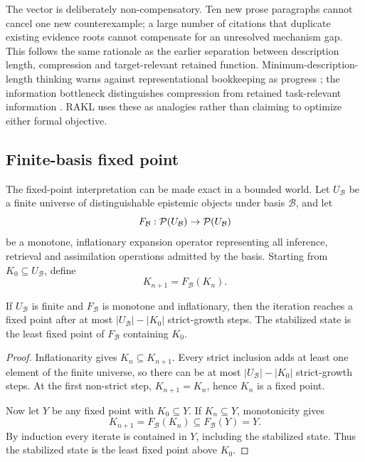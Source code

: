 The vector is deliberately non-compensatory. Ten new prose paragraphs cannot cancel one new counterexample; a large number of citations that duplicate existing evidence roots cannot compensate for an unresolved mechanism gap. This follows the same rationale as the earlier separation between description length, compression and target-relevant retained function. Minimum-description-length thinking warns against representational bookkeeping as progress \cite{rissanen1978}; the information bottleneck distinguishes compression from retained task-relevant information \cite{tishby2000}. RAKL uses these as analogies rather than claiming to optimize either formal objective.

\subsection{Finite-basis fixed point}

The fixed-point interpretation can be made exact in a bounded world. Let \(U_{\mathcal B}\) be a finite universe of distinguishable epistemic objects under basis \(\mathcal B\), and let
\[
F_{\mathcal B}:\mathcal P(U_{\mathcal B})\to\mathcal P(U_{\mathcal B})
\]
be a monotone, inflationary expansion operator representing all inference, retrieval and assimilation operations admitted by the basis. Starting from \(K_0\subseteq U_{\mathcal B}\), define
\[
K_{n+1}=F_{\mathcal B}(K_n).
\]

\begin{theorem}
If \(U_{\mathcal B}\) is finite and \(F_{\mathcal B}\) is monotone and inflationary, then the iteration reaches a fixed point after at most \(|U_{\mathcal B}|-|K_0|\) strict-growth steps. The stabilized state is the least fixed point of \(F_{\mathcal B}\) containing \(K_0\).
\end{theorem}

\begin{proof}
Inflationarity gives \(K_n\subseteq K_{n+1}\). Every strict inclusion adds at least one element of the finite universe, so there can be at most \(|U_{\mathcal B}|-|K_0|\) strict-growth steps. At the first non-strict step, \(K_{n+1}=K_n\), hence \(K_n\) is a fixed point.

Now let \(Y\) be any fixed point with \(K_0\subseteq Y\). If \(K_n\subseteq Y\), monotonicity gives
\[
K_{n+1}=F_{\mathcal B}(K_n)\subseteq F_{\mathcal B}(Y)=Y.
\]
By induction every iterate is contained in \(Y\), including the stabilized state. Thus the stabilized state is the least fixed point above \(K_0\).
\end{proof}

